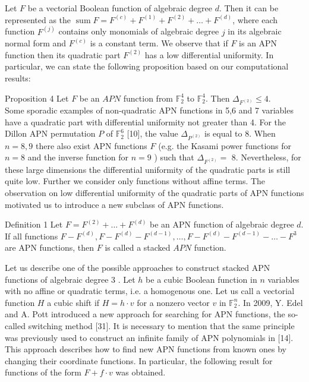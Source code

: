 \documentclass[10pt]{article}
\begin{document}
Let $F$ be a vectorial Boolean function of algebraic degree $d$. Then it can be represented as the $\operatorname{sum} F=F^{(c)}+F^{(1)}+F^{(2)}+\ldots+F^{(d)}$, where each function $F^{(j)}$ contains only monomials of algebraic degree $j$ in its algebraic normal form and $F^{(c)}$ is a constant term. We observe that if $F$ is an APN function then its quadratic part $F^{(2)}$ has a low differential uniformity. In particular, we can state the following proposition based on our computational results:

Proposition 4 Let $F$ be an $A P N$ function from $\mathbb{F}_{2}^{4}$ to $\mathbb{F}_{2}^{4}$. Then $\Delta_{F^{(2)}} \leqslant 4$.\\
Some sporadic examples of non-quadratic APN functions in 5,6 and 7 variables have a quadratic part with differential uniformity not greater than 4. For the Dillon APN permutation $P$ of $\mathbb{F}_{2}^{6}$ [10], the value $\Delta_{P^{(2)}}$ is equal to 8. When $n=8,9$ there also exist APN functions $F$ (e.g. the Kasami power functions for $n=8$ and the inverse function for $n=9$ ) such that $\Delta_{F^{(2)}}=$ 8. Nevertheless, for these large dimensions the differential uniformity of the quadratic parts is still quite low. Further we consider only functions without affine terms. The observation on low differential uniformity of the quadratic parts of APN functions motivated us to introduce a new subclass of APN functions.

Definition 1 Let $F=F^{(2)}+\ldots+F^{(d)}$ be an APN function of algebraic degree $d$. If all functions $F-F^{(d)}, F-F^{(d)}-F^{(d-1)}, \ldots, F-F^{(d)}-F^{(d-1)}-\ldots-F^{3}$ are APN functions, then $F$ is called a stacked $A P N$ function.

Let us describe one of the possible approaches to construct stacked APN functions of algebraic degree 3 . Let $h$ be a cubic Boolean function in $n$ variables with no affine or quadratic terms, i.e. a homogenous one. Let us call a vectorial function $H$ a cubic shift if $H=h \cdot v$ for a nonzero vector $v$ in $\mathbb{F}_{2}^{n}$. In 2009, Y. Edel and A. Pott introduced a new approach for searching for APN functions, the so-called switching method [31]. It is necessary to mention that the same principle was previously used to construct an infinite family of APN polynomials in [14]. This approach describes how to find new APN functions from known ones by changing their coordinate functions. In particular, the following result for functions of the form $F+f \cdot v$ was obtained.
\end{document}
